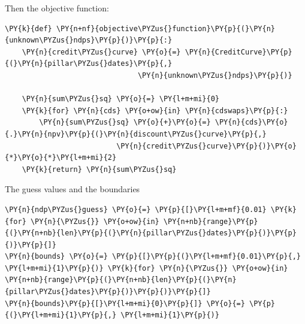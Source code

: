 Then the objective function:
\begin{tcolorbox}[breakable, size=fbox, boxrule=1pt, pad at break*=1mm,colback=cellbackground, colframe=cellborder]
\begin{Verbatim}[commandchars=\\\{\}]
\PY{k}{def} \PY{n+nf}{objective\PYZus{}function}\PY{p}{(}\PY{n}{unknown\PYZus{}ndps}\PY{p}{)}\PY{p}{:}
    \PY{n}{credit\PYZus{}curve} \PY{o}{=} \PY{n}{CreditCurve}\PY{p}{(}\PY{n}{pillar\PYZus{}dates}\PY{p}{,} 
                               \PY{n}{unknown\PYZus{}ndps}\PY{p}{)}
	
    \PY{n}{sum\PYZus{}sq} \PY{o}{=} \PY{l+m+mi}{0}
    \PY{k}{for} \PY{n}{cds} \PY{o+ow}{in} \PY{n}{cdswaps}\PY{p}{:}
        \PY{n}{sum\PYZus{}sq} \PY{o}{+}\PY{o}{=} \PY{n}{cds}\PY{o}{.}\PY{n}{npv}\PY{p}{(}\PY{n}{discount\PYZus{}curve}\PY{p}{,} 
                          \PY{n}{credit\PYZus{}curve}\PY{p}{)}\PY{o}{*}\PY{o}{*}\PY{l+m+mi}{2}
    \PY{k}{return} \PY{n}{sum\PYZus{}sq}
\end{Verbatim}
\end{tcolorbox}

The guess values and the boundaries
\begin{tcolorbox}[breakable, size=fbox, boxrule=1pt, pad at break*=1mm,colback=cellbackground, colframe=cellborder]
\begin{Verbatim}[commandchars=\\\{\}]
\PY{n}{ndp\PYZus{}guess} \PY{o}{=} \PY{p}{[}\PY{l+m+mf}{0.01} \PY{k}{for} \PY{n}{\PYZus{}} \PY{o+ow}{in} \PY{n+nb}{range}\PY{p}{(}\PY{n+nb}{len}\PY{p}{(}\PY{n}{pillar\PYZus{}dates}\PY{p}{)}\PY{p}{)}\PY{p}{]}
\PY{n}{bounds} \PY{o}{=} \PY{p}{[}\PY{p}{(}\PY{l+m+mf}{0.01}\PY{p}{,} \PY{l+m+mi}{1}\PY{p}{)} \PY{k}{for} \PY{n}{\PYZus{}} \PY{o+ow}{in} \PY{n+nb}{range}\PY{p}{(}\PY{n+nb}{len}\PY{p}{(}\PY{n}{pillar\PYZus{}dates}\PY{p}{)}\PY{p}{)}\PY{p}{]}
\PY{n}{bounds}\PY{p}{[}\PY{l+m+mi}{0}\PY{p}{]} \PY{o}{=} \PY{p}{(}\PY{l+m+mi}{1}\PY{p}{,} \PY{l+m+mi}{1}\PY{p}{)}
\end{Verbatim}
\end{tcolorbox}

